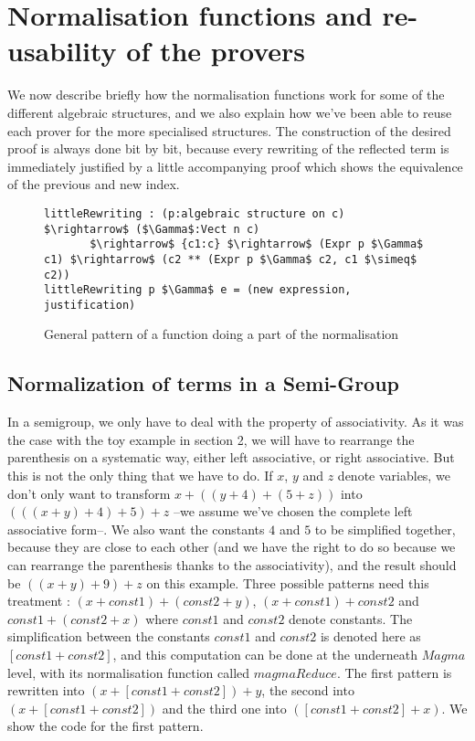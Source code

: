 \section {Normalisation functions and re-usability of the provers}

We now describe briefly how the normalisation functions work for some of the different algebraic structures, and we also explain how we've been able to reuse each prover for the more specialised structures. The construction of the desired proof is always done bit by bit, because every rewriting of the reflected term is immediately justified by a little accompanying proof which shows the equivalence of the previous and new index.
\begin{figure}[H]
\figrule
\begin{center}
\begin{lstlisting}
littleRewriting : (p:algebraic structure on c) $\rightarrow$ ($\Gamma$:Vect n c) 
       $\rightarrow$ {c1:c} $\rightarrow$ (Expr p $\Gamma$ c1) $\rightarrow$ (c2 ** (Expr p $\Gamma$ c2, c1 $\simeq$ c2))
littleRewriting p $\Gamma$ e = (new expression, justification)
\end{lstlisting}
\end{center}
\caption{General pattern of a function doing a part of the normalisation}
\figrule
\end{figure}

	\subsection {Normalization of terms in a Semi-Group}
In a semigroup, we only have to deal with the property of associativity. As it was the case with the toy example in section 2, we will have to rearrange the parenthesis on a systematic way, either left associative, or right associative. But this is not the only thing that we have to do. If $x$, $y$ and $z$ denote variables, we don't only want to transform $x+((y+4)+(5+z))$ into $(((x+y)+4)+5)+z$ --we assume we've chosen the complete left associative form--. We also want the constants $4$ and $5$ to be simplified together, because they are close to each other (and we have the right to do so because we can rearrange the parenthesis thanks to the associativity), and the result should be $((x+y)+9)+z$ on this example. Three possible patterns need this treatment : $(x+const1)+(const2+y)$, $(x + const1) + const2$  and $const1 + (const2 + x)$ where $const1$ and $const2$ denote constants. The simplification between the constants $const1$ and $const2$ is denoted here as $[const1+const2]$, and this computation can be done at the underneath $Magma$ level, with its normalisation function called $magmaReduce$.
The first pattern is rewritten into $(x + [const1+const2]) + y$, the second into $(x + [const1+const2])$ and the third one into $([const1 + const2] + x)$.
We show the code for the first pattern.

